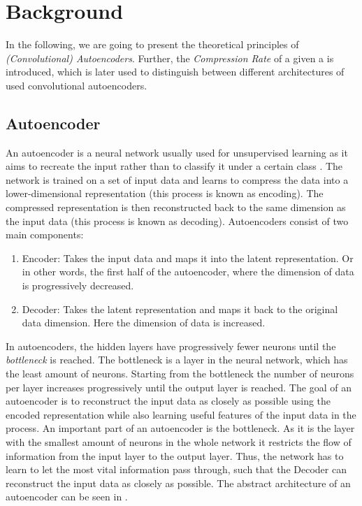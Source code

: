 \section{Background}
\label{sec:background}
In the following, we are going to present the theoretical principles of \textit{(Convolutional) Autoencoders}. 
Further, the \textit{Compression Rate} of a given a is introduced, which is later used to distinguish between different architectures of used convolutional autoencoders.
\subsection{Autoencoder} \label{sec:autoencoder}
An autoencoder is a neural network usually used for unsupervised learning as it aims to recreate the input rather than to classify it under a certain class \cite{autoencoder_not_classify}.
The network is trained on a set of input data and learns to compress the data into a lower-dimensional representation (this process is known as encoding). 
The compressed representation is then reconstructed back to the same dimension as the input data (this process is known as decoding). 
Autoencoders consist of two main components: 
\begin{enumerate}
	\item Encoder: Takes the input data and maps it into the latent representation. Or in other words, the first half of the autoencoder, where the dimension of data is progressively decreased.
	\item Decoder: Takes the latent representation and maps it back to the original data dimension. Here the dimension of data is increased.
\end{enumerate}
In autoencoders, the hidden layers have progressively fewer neurons until the \textit{bottleneck} is reached. 
The bottleneck is a layer in the neural network, which has the least amount of neurons. 
Starting from the bottleneck the number of neurons per layer increases progressively until the output layer is reached.
The goal of an autoencoder is to reconstruct the input data as closely as possible using the encoded representation while also learning useful features of the input data in the process.
An important part of an autoencoder is the bottleneck. As it is the layer with the smallest amount of neurons in the whole network it restricts the flow of information from the input layer to the output layer.
Thus, the network has to learn to let the most vital information pass through, such that the Decoder can reconstruct the input data as closely as possible.
The abstract architecture of an autoencoder can be seen in .
